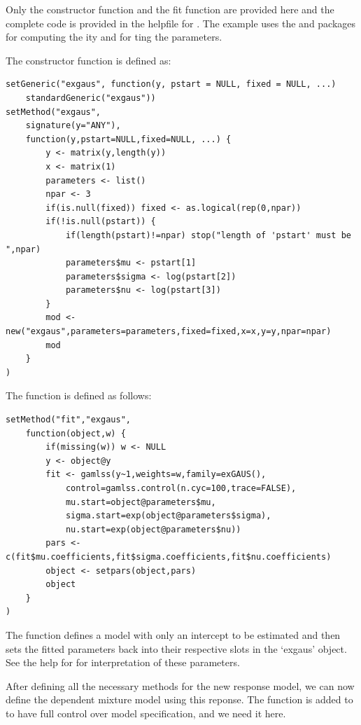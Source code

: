 \documentclass[article]{jss}
\begin{document}
Only the constructor function and the fit function are provided here
and the complete code is provided in the helpfile for . 
The  example uses the  and  packages \cite{Stasinopoulos2009a,Stasinopoulos2009b} for 
computing the ity and for ting the parameters. 

The constructor function is defined as: 
\begin{verbatim}
setGeneric("exgaus", function(y, pstart = NULL, fixed = NULL, ...) 
	standardGeneric("exgaus"))
setMethod("exgaus", 
	signature(y="ANY"), 
	function(y,pstart=NULL,fixed=NULL, ...) {
		y <- matrix(y,length(y))
		x <- matrix(1)
		parameters <- list()
		npar <- 3
		if(is.null(fixed)) fixed <- as.logical(rep(0,npar))
		if(!is.null(pstart)) {
			if(length(pstart)!=npar) stop("length of 'pstart' must be ",npar)
			parameters$mu <- pstart[1]
			parameters$sigma <- log(pstart[2])
			parameters$nu <- log(pstart[3])
		}
		mod <- new("exgaus",parameters=parameters,fixed=fixed,x=x,y=y,npar=npar)
		mod
	}
)
\end{verbatim}

The  function is defined as follows: 
\begin{verbatim}
setMethod("fit","exgaus",
	function(object,w) {
		if(missing(w)) w <- NULL
		y <- object@y
		fit <- gamlss(y~1,weights=w,family=exGAUS(),
			control=gamlss.control(n.cyc=100,trace=FALSE),
			mu.start=object@parameters$mu,
			sigma.start=exp(object@parameters$sigma),
			nu.start=exp(object@parameters$nu))
		pars <- c(fit$mu.coefficients,fit$sigma.coefficients,fit$nu.coefficients)
		object <- setpars(object,pars)
		object
	}
)
\end{verbatim}

The  function defines a  model with 
only an intercept to be estimated and then sets the fitted parameters 
back into their respective slots in the `exgaus' object. See the help 
for  for interpretation of these parameters. 

After defining all the necessary methods for the new response model, 
we can  now define the dependent mixture model using this reponse. 
The function  is added to  to have 
full control over model specification, and we need it here. 
\end{document}
